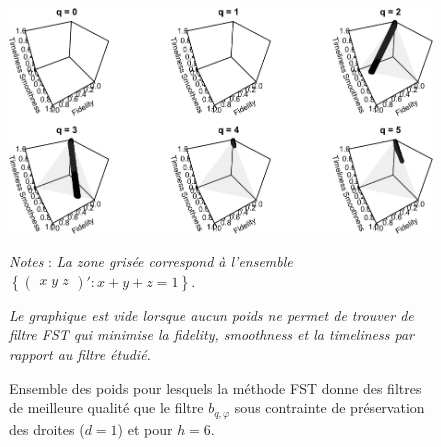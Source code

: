 \documentclass[
  11pt,
  french,
  a4paper]{article}
\newcommand\1{\mathds{1}}
\begin{document}
\begin{figure}[H]

{\centering \includegraphics{img/bookdown/pdf/rkhs6d1-1} 

}

\caption[Ensemble des poids pour lesquels la méthode FST donne des filtres de meilleure qualité que le filtre \(b_{q,\varphi}\) sous contrainte de préservation des droites (\(d=1\)) et pour \(h=6\)]{Ensemble des poids pour lesquels la méthode FST donne des filtres de meilleure qualité que le filtre \(b_{q,\varphi}\) sous contrainte de préservation des droites (\(d=1\)) et pour \(h=6\).}\label{fig:rkhs6d1}

\footnotesize


\emph{Notes} : \emph{La zone grisée correspond à l'ensemble \(\left\{\begin{pmatrix}x \; y \; z \end{pmatrix}' : x+y+z=1\right\}\).}

\emph{Le graphique est vide lorsque aucun poids ne permet de trouver de filtre FST qui minimise la \emph{fidelity}, \emph{smoothness} et la \emph{timeliness} par rapport au filtre étudié.}
\normalsize\end{figure}
\end{document}
